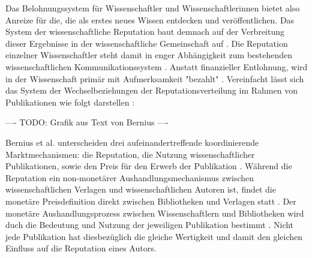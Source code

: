 \begin{enumerate}
\begin{end}
Das Belohnungssystem für Wissenschaftler und Wissenschaftlerinnen bietet also Anreize für die, die als erstes neues Wissen entdecken und veröffentlichen. Das System der wissenschaftliche Reputation baut demnach auf der Verbreitung dieser Ergebnisse in der wissenschaftliche Gemeinschaft auf \cite{Fabrizio_2008}. Die Reputation einzelner Wissenschaftler steht damit in enger Abhängigkeit zum bestehenden wissenschaftlichen Kommunikationssystem \cite{suchen}. Anstatt finanzieller Entlohnung, wird in der Wissenschaft primär mit Aufmerksamkeit "bezahlt" \cite{suchen}. Vereinfacht lässt sich das System der Wechselbeziehungen der Reputationsverteilung im Rahmen von Publikationen wie folgt darstellen \cite{cite:21a}:

---- TODO: Grafik aus Text von Bernius ----

Bernius et al. unterscheiden drei aufeinandertreffende koordinierende Marktmechanismen: die Reputation, die Nutzung wissenschaftlicher Publikationen, sowie den Preis für den Erwerb der Publikation \cite{cite:21a}. Während die Reputation ein non-monetärer Aushandlungsmechanismus zwischen wissenschaftlichen Verlagen und wissenschaftlichen Autoren ist, findet die monetäre Preisdefinition direkt zwischen Bibliotheken und Verlagen statt \cite{EuropeanCommission_sciencepub_2006}. Der monetäre Aushandlungsprozess zwischen Wissenschaftlern und Bibliotheken wird duch die Bedeutung und Nutzung der jeweiligen Publikation bestimmt \cite{cite:21a}. Nicht jede Publikation hat diesbezüglich die gleiche Wertigkeit \cite{suchen} und damit den gleichen Einfluss auf die Reputation eines Autors.


\end{end}
\end{enumerate}
